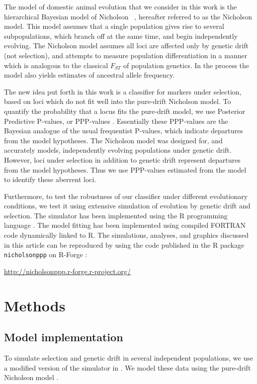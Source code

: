 \documentclass[a4paper,12pt]{article}
\begin{document}
The model of domestic animal evolution that we consider in this work
is the hierarchical Bayesian model of Nicholson \etal\
\cite{nicholson}, hereafter referred to as the Nicholson model. This
model assumes that a single population gives rise to several
subpopulations, which branch off at the same time, and begin
independently evolving. The Nicholson model assumes all loci are
affected only by genetic drift (not selection), and attempts to
measure population differentiation in a manner which is analogous to
the classical $F_{ST}$ of population genetics. In the process the
model also yields estimates of ancestral allele frequency.

The new idea put forth in this work is a classifier for markers under
selection, based on loci which do not fit well into the pure-drift
Nicholson model. To quantify the probability that a locus fits the
pure-drift model, we use Posterior Predictive P-values, or PPP-values
\cite{pppvalues,foulley-gautier}. Essentially these PPP-values are the
Bayesian analogue of the usual frequentist P-values, which indicate
departures from the model hypotheses. The Nicholson model was designed
for, and accurately models, independently evolving populations under
genetic drift. However, loci under selection in addition to genetic
drift represent departures from the model hypotheses. Thus we use
PPP-values estimated from the model to identify these aberrent loci.

Furthermore, to test the robustness of our classifier under different
evolutionary conditions, we test it using extensive simulation of
evolution by genetic drift and selection. The simulator has been
implemented using the R programming language \cite{R}. The model
fitting has been implemented using compiled FORTRAN code dynamically
linked to R. The simulations, analyses, and graphics discussed in this
article can be reproduced by using the code published in the R package
\texttt{nicholsonppp} on R-Forge \cite{R-Forge}:

 \url{http://nicholsonppp.r-forge.r-project.org/}

\section{Methods}

\subsection{Model implementation}

To simulate selection and genetic drift in several independent
populations, we use a modified version of the simulator in
\cite{Beaumont-Balding}. We model these data using the pure-drift
Nicholson model \cite{nicholson}.
\end{document}
